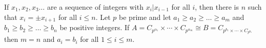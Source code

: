  If $x_1, x_2, x_3 \ldots$ are a sequence of integers with $x_i|x_{i-1}$ for all $i$, then there is $n$ such that $x_i = \pm x_{i+1}$ for all $i \le n$.
 Let $p$ be prime and let $a_1 \ge a_2 \ge \ldots \ge a_m$ and $b_1 \ge b_2 \ge \ldots \ge b_n$ be positive integers. If $A = C_{p^{\alpha_1}} \times \cdots \times C_{p^{\alpha_m}} \cong B = C_{p^{b_1} \times \cdots \times C_{p^{b_n}}}$ then $m = n$ and $a_i = b_i$ for all $1 \le i \le m$.
